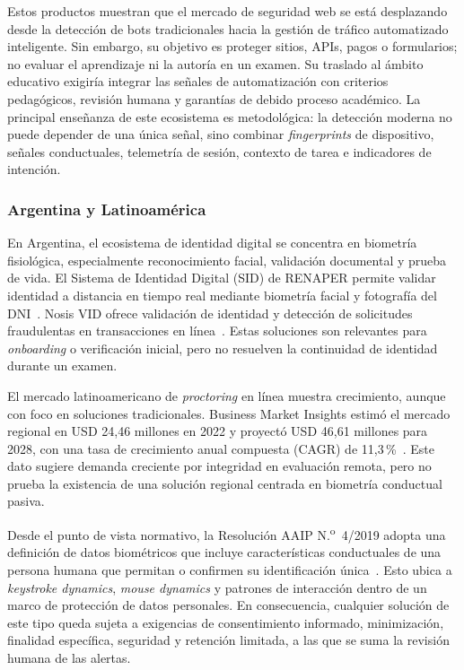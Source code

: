 Estos productos muestran que el mercado de seguridad web se está desplazando desde la detección de bots tradicionales hacia la gestión de tráfico automatizado inteligente. Sin embargo, su objetivo es proteger sitios, APIs, pagos o formularios; no evaluar el aprendizaje ni la autoría en un examen. Su traslado al ámbito educativo exigiría integrar las señales de automatización con criterios pedagógicos, revisión humana y garantías de debido proceso académico. La principal enseñanza de este ecosistema es metodológica: la detección moderna no puede depender de una única señal, sino combinar \textit{fingerprints} de dispositivo, señales conductuales, telemetría de sesión, contexto de tarea e indicadores de intención.

\subsubsection{Argentina y Latinoamérica}
En Argentina, el ecosistema de identidad digital se concentra en biometría fisiológica, especialmente reconocimiento facial, validación documental y prueba de vida. El Sistema de Identidad Digital (SID) de RENAPER permite validar identidad a distancia en tiempo real mediante biometría facial y fotografía del DNI~\parencite{RENAPER}. Nosis VID ofrece validación de identidad y detección de solicitudes fraudulentas en transacciones en línea~\parencite{Nosis}. Estas soluciones son relevantes para \textit{onboarding} o verificación inicial, pero no resuelven la continuidad de identidad durante un examen.

El mercado latinoamericano de \textit{proctoring} en línea muestra crecimiento, aunque con foco en soluciones tradicionales. Business Market Insights estimó el mercado regional en USD 24,46 millones en 2022 y proyectó USD 46,61 millones para 2028, con una tasa de crecimiento anual compuesta (CAGR) de 11,3\,\%~\parencite{BusinessMarketInsights}. Este dato sugiere demanda creciente por integridad en evaluación remota, pero no prueba la existencia de una solución regional centrada en biometría conductual pasiva.

Desde el punto de vista normativo, la Resolución AAIP N.\textsuperscript{o}~4/2019 adopta una definición de datos biométricos que incluye características conductuales de una persona humana que permitan o confirmen su identificación única~\parencite{AAIP2019Res4}. Esto ubica a \textit{keystroke dynamics}, \textit{mouse dynamics} y patrones de interacción dentro de un marco de protección de datos personales. En consecuencia, cualquier solución de este tipo queda sujeta a exigencias de consentimiento informado, minimización, finalidad específica, seguridad y retención limitada, a las que se suma la revisión humana de las alertas.

